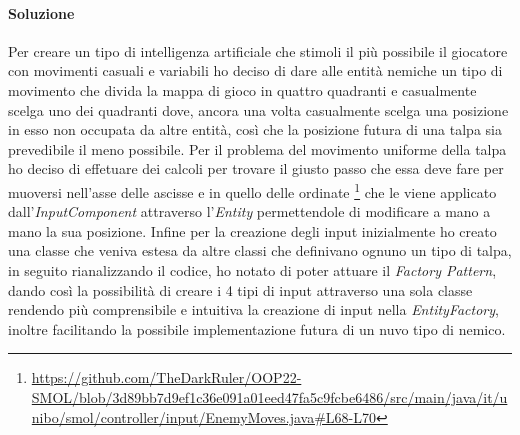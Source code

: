 \documentclass[a4paper,12pt]{report}
\begin{document}
\paragraph{Soluzione}
    Per creare un tipo di intelligenza artificiale che stimoli il più possibile il giocatore con movimenti casuali e variabili 
    ho deciso di dare alle entità nemiche un tipo di movimento che divida la mappa di gioco in quattro quadranti e casualmente 
    scelga uno dei quadranti dove, ancora una volta casualmente scelga una posizione in esso non occupata da altre entità, 
    così che la posizione futura di una talpa sia prevedibile il meno possibile. Per il problema del movimento uniforme 
    della talpa ho deciso di effetuare dei calcoli per trovare il giusto passo che essa deve fare per muoversi 
    nell'asse delle ascisse e in quello delle ordinate \footnote{\url{https://github.com/TheDarkRuler/OOP22-SMOL/blob/3d89bb7d9ef1c36e091a01eed47fa5c9fcbe6486/src/main/java/it/unibo/smol/controller/input/EnemyMoves.java#L68-L70}}
    che le viene applicato dall'\emph{InputComponent} attraverso l'\emph{Entity} permettendole di modificare a mano a mano la sua posizione.
    Infine per la creazione degli input inizialmente ho creato una classe che veniva estesa da altre classi che definivano 
    ognuno un tipo di talpa, in seguito rianalizzando il codice, ho notato di poter attuare il \emph{Factory Pattern}, dando così 
    la possibilità di creare i 4 tipi di input attraverso una sola classe rendendo più comprensibile e intuitiva la creazione 
    di input nella \emph{EntityFactory}, inoltre facilitando la possibile implementazione futura di un nuvo tipo di nemico.
\end{document}
